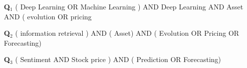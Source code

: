 \documentclass[11pt]{article}
\begin{document}
\begin{enumerate}\label{T:searchQueries}

    \item[\textbf{Q$_1$}]
    (  {Deep Learning} OR   {Machine Learning} ) AND   {Deep Learning} AND   {Asset} AND (  {evolution} OR   {pricing} \label{Word:SearchQuery1}
    
    \item[\textbf{Q$_2$}]
    (  {information retrieval} ) AND (   {Asset}) AND (  {Evolution} OR   {Pricing} OR   {Forecasting})  \label{Word:SearchQuery2}

    \item[\textbf{Q$_3$}]
    (  {Sentiment} AND   {Stock price} ) AND (  {Prediction} OR   {Forecasting}) \\ \label{Word:SearchQuery3}
\end{enumerate} 
\end{document}
